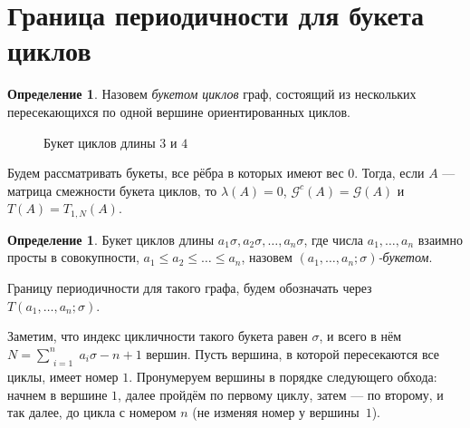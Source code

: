 \documentclass[12pt]{article}
\theoremstyle{definition}
\newtheorem{definition}[theorem]{Определение}
\begin{document}
\section{Граница периодичности для букета циклов}
\label{wedge}
\begin{definition} Назовем \textit{букетом циклов} граф, состоящий из нескольких пересекающихся по одной вершине ориентированных циклов.
\end{definition}

\begin{figure}[t]
\centering
{}
\caption{Букет циклов длины $3$ и $4$}
\end{figure}

Будем рассматривать букеты, все рёбра в которых имеют вес $0$. Тогда, если $A$ --- матрица смежности букета циклов, то $\lambda(A) = 0$, $\mathcal{G}^c(A) = \mathcal{G}(A)$ и $T(A) = T_{1, N}(A)$.

\begin{definition}
Букет циклов длины $a_1\sigma, a_2\sigma, \dots, a_n\sigma$, где числа $a_1, \dots, a_n$ взаимно просты в совокупности, $a_1\le a_2 \le \dots \le a_n$, назовем \textit{$(a_1, \dots, a_n; \sigma)$-букетом}.

Границу периодичности для такого графа, будем обозначать через $T(a_1, \dots, a_n; \sigma)$.
\end{definition}

Заметим, что индекс цикличности такого букета равен $\sigma$, и всего в нём $N = \sum\limits_{\substack{i=1}}^n a_i\sigma - n + 1$ вершин. Пусть вершина, в которой пересекаются все циклы, имеет номер $1$. Пронумеруем вершины в порядке следующего обхода: начнем в вершине $1$, далее пройдём по первому циклу, затем --- по второму, и так далее, до цикла с номером $n$ (не изменяя номер у вершины~$1$).
\end{document}
